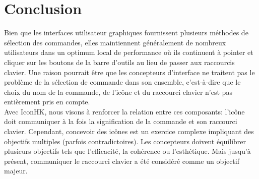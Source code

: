 \documentclass[12pt,a4paper]{article}
\newcommand\tab[1][0.65cm]{\hspace*{#1}}
\begin{document}
\section{Conclusion}
Bien que les interfaces utilisateur graphiques fournissent plusieurs méthodes de sélection des commandes, elles maintiennent généralement de nombreux utilisateurs dans un optimum local de performance où ils continuent à pointer et cliquer sur les boutons de la barre d'outils au lieu de
passer aux raccourcis clavier. Une raison pourrait être que les concepteurs d'interface ne traitent pas le problème de la sélection de commande dans son ensemble, c'est-à-dire que le choix du nom de la commande, de l'icône et du raccourci clavier n'est pas entièrement pris en compte.\\
\tab Avec IconHK, nous visons à renforcer la relation entre ces composants: l'icône doit communiquer à la fois la signification de la commande et son raccourci clavier. Cependant, concevoir des icônes est un exercice complexe impliquant des objectifs multiples (parfois contradictoires). Les concepteurs doivent équilibrer plusieurs objectifs tels que l'efficacité, la cohérence ou l'esthétique. Mais jusqu'à
présent, communiquer le raccourci clavier a été considéré comme un objectif majeur.
\newpage
\end{document}
